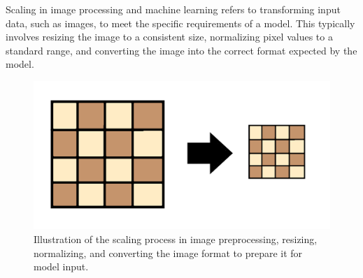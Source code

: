 Scaling in image processing and machine learning refers to transforming input data, such as images, to meet the specific requirements of a model. This typically involves resizing the image to a consistent size, normalizing pixel values to a standard range, and converting the image into the correct format expected by the model.





\begin{figure}[h!]
    \centering
    \includegraphics[width=0.75\linewidth]{figures/theory/image-recognition/scaling.png}
    \caption[Scaling process in image preprocessing]{Illustration of the scaling process in image preprocessing, resizing, normalizing, and converting the image format to prepare it for model input. \cite{thepythoncode:nms}}
    \label{fig:nms}
\end{figure}

